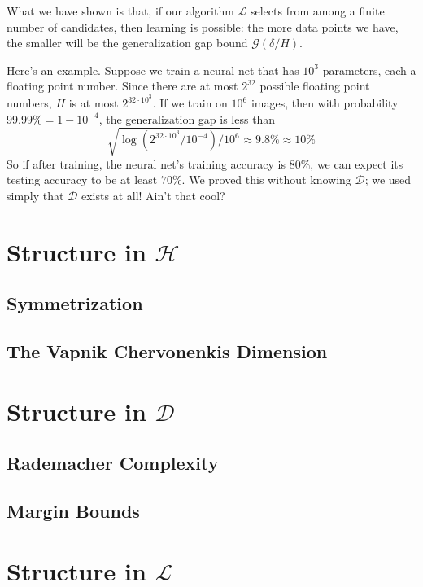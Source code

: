 \documentclass{article}
\newcommand{\Dd}{\mathcal{D}}
\newcommand{\Gg}{\mathcal{G}}
\newcommand{\Hh}{\mathcal{H}}
\newcommand{\Ll}{\mathcal{L}}
\begin{document}
            What we have shown is that, if our algorithm $\Ll$ selects from among
            a finite number of candidates, then learning is possible: the
            more data points we have, the smaller will be the generalization
            gap bound $\Gg(\delta/H)$.

            Here's an example.  Suppose we train a neural net that has $10^3$
            parameters, each a floating point number.  Since there are at most
            $2^{32}$ possible floating point numbers, $H$ is at most
            $2^{32\cdot 10^3}$.  If we train on $10^6$ images, then with
            probability $99.99\%=1-10^{-4}$, the generalization gap is less
            than
            $$
                \sqrt{\log(2^{32\cdot 10^3}/10^{-4})/10^6}
                \approx 9.8\%
                \approx 10\%
            $$
            So if after training, the neural net's training accuracy is $80\%$,
            we can expect its testing accuracy to be at least $70\%$.
            We proved this without knowing $\Dd$; we used simply that $\Dd$
            exists at all!  Ain't that cool?

    \section{Structure in $\Hh$}
        \subsection{Symmetrization}
        \subsection{The Vapnik Chervonenkis Dimension}

    \section{Structure in $\Dd$}
        \subsection{Rademacher Complexity}
        \subsection{Margin Bounds}

    \section{Structure in $\Ll$}
\end{document}

